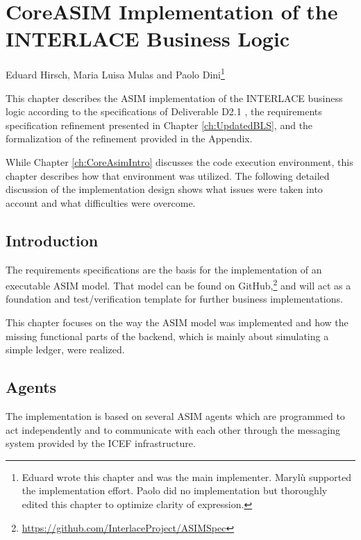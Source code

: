 \chapter{CoreASIM Implementation of the INTERLACE Business Logic}
\label{ch:CoreAsimImplementation}

\vspace{-1cm}
\begin{center}
Eduard Hirsch, Maria Luisa Mulas and Paolo Dini\footnote{Eduard wrote this chapter and was the main implementer. Maryl\`u supported the implementation effort. Paolo did no implementation but thoroughly edited this chapter to optimize clarity of expression.}
\end{center}

This chapter describes the ASIM implementation of the INTERLACE business logic according to the specifications of Deliverable D2.1 \cite{INTERLACE_D21}, the requirements specification refinement presented in Chapter \ref{ch:UpdatedBLS}, and the formalization of the refinement provided in the Appendix.

While Chapter \ref{ch:CoreAsimIntro} discusses the code execution environment, this chapter describes how that environment was utilized. The following detailed discussion of the implementation design shows what issues were taken into account and what difficulties were overcome.


\section{Introduction}
\label{sec:impl_intro}

The requirements specifications are the basis for the implementation of an executable ASIM model. That model can be found on GitHub,\footnote{\url{https://github.com/InterlaceProject/ASIMSpec}} and will act as a foundation and test/verification template for further business implementations.

This chapter focuses on the way the ASIM model was implemented and how the missing functional parts of the backend, which is mainly about simulating a simple ledger, were realized.

\section{Agents}
\label{sec:impl-agents}

The implementation is based on several ASIM agents which are programmed to act independently and to communicate with each other through the messaging system provided by the ICEF infrastructure.

